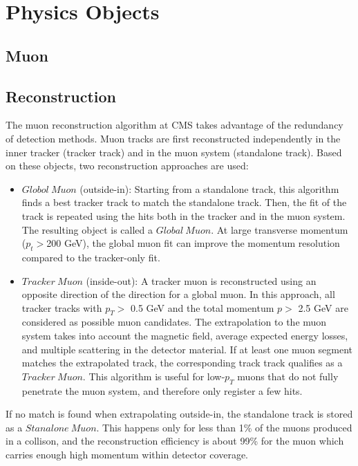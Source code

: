 \section{Physics Objects}

\subsection{Muon}
\subsection*{Reconstruction}
The muon reconstruction algorithm at CMS takes advantage of the redundancy of detection methods. Muon tracks are first reconstructed independently in the inner tracker (tracker track) and in the muon system (standalone track). Based on these objects, two reconstruction approaches are used\cite{MuonReco}:
\begin{itemize}
\item $Globol~Muon$ (outside-in): Starting from a standalone track, this algorithm finds a best tracker track to match the standalone track. Then, the fit of the track is repeated using the hits both in the tracker and in the muon system\cite{KF}. The resulting object is called a $Global~Muon$. At large transverse momentum ($p_{t} > $200 GeV), the global muon fit can improve the momentum resolution compared to the tracker-only fit.
\item $Tracker~Muon$ (inside-out): A tracker muon is reconstructed using an opposite direction of the direction for a global muon. In this approach, all tracker tracks with $p_{T} >$ 0.5 GeV and the total momentum $p >$ 2.5 GeV are considered as possible muon candidates. The extrapolation to the muon system takes into account the magnetic field, average expected energy losses, and multiple scattering in the detector material. If at least one muon segment matches the extrapolated track, the corresponding track track qualifies as a $Tracker~Muon$. This algorithm is useful for low-$p_{T}$ muons that do not fully penetrate the muon system, and therefore only register a few hits.
\end{itemize}

If no match is found when extrapolating outside-in, the standalone track is stored as a $Stanalone~Muon$. This happens only for less than 1\% of the muons produced in a collison, and the reconstruction efficiency is about 99\% for the muon which carries enough high momentum within detector coverage\cite{MuonReco}.

